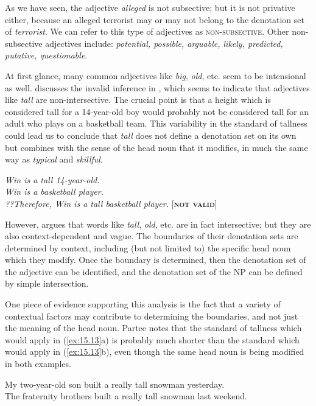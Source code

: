 As we have seen, the adjective \textit{alleged} is not subsective; but it is not privative either, because an alleged terrorist may or may not belong to the denotation set of \textit{terrorist}. We can refer to this type of adjectives as \textsc{non-subsective}. Other non-subsective adjectives include: \textit{potential, possible, arguable, likely, predicted, putative, questionable}.



At first glance, many common adjectives like \textit{big}, \textit{old}, etc. seem to be intensional as well. \citet{Partee1995} discusses the invalid inference in , which seems to indicate that adjectives like \textit{tall} are non-intersective. The crucial point is that a height which is considered tall for a 14-year-old boy would probably not be considered tall for an adult who plays on a basketball team. This variability in the standard of tallness could lead us to conclude that \textit{tall} does not define a denotation set on its own but combines with the sense of the head noun that it modifies, in much the same way as \textit{typical} and \textit{skillful}.


\ea \label{ex:15.12}
\textit{Win is a tall 14-year-old.}\\
\textit{Win is a basketball player.\\
\FelixHRule
??Therefore, Win is a tall basketball player.}   [\textbf{\textsc{not valid}}]
\z


However, \citet{Siegel1976} argues that words like \textit{tall}, \textit{old}, etc. are in fact intersective; but they are also context-dependent and vague. The boundaries of their denotation sets are determined by context, including (but not limited to) the specific head noun which they modify. Once the boundary is determined, then the denotation set of the adjective can be identified, and the denotation set of the NP can be defined by simple intersection.



One piece of evidence supporting this analysis is the fact that a variety of contextual factors may contribute to determining the boundaries, and not just the meaning of the head noun. Partee notes that the standard of tallness which would apply in (\ref{ex:15.13}a) is probably much shorter than the standard which would apply in (\ref{ex:15.13}b), even though the same head noun is being modified in both examples.


\ea \label{ex:15.13}
\ea \label{ex:15.} My two-year-old son built a really tall snowman yesterday.\\
\ex The fraternity brothers built a really tall snowman last weekend.
                       \z
\z


